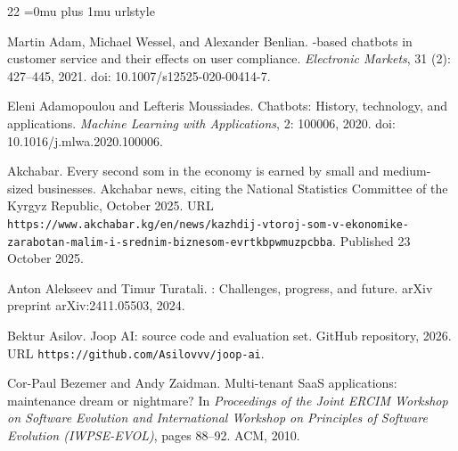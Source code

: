 \begin{thebibliography}{22}
\Urlmuskip=0mu plus 1mu %
\providecommand{\natexlab}[1]{#1}
\providecommand{\url}[1]{\texttt{#1}}
\expandafter\ifx\csname urlstyle\endcsname\relax
  \providecommand{\doi}[1]{doi: #1}\else
  \providecommand{\doi}{doi: \begingroup \urlstyle{rm}\Url}\fi

Martin Adam, Michael Wessel, and Alexander Benlian.
-based chatbots in customer service and their effects on user
  compliance.
\newblock \emph{Electronic Markets}, 31 (2): 427--445, 2021.
\newblock \doi{10.1007/s12525-020-00414-7}.

Eleni Adamopoulou and Lefteris Moussiades.
\newblock Chatbots: History, technology, and applications.
\newblock \emph{Machine Learning with Applications}, 2: 100006, 2020.
\newblock \doi{10.1016/j.mlwa.2020.100006}.

{Akchabar}.
\newblock Every second som in the economy is earned by small and medium-sized
  businesses.
\newblock Akchabar news, citing the National Statistics Committee of the Kyrgyz
  Republic, October 2025.
\newblock URL
  \url{https://www.akchabar.kg/en/news/kazhdij-vtoroj-som-v-ekonomike-zarabotan-malim-i-srednim-biznesom-evrtkbpwmuzpcbba}.
\newblock Published 23 October 2025.

Anton Alekseev and Timur Turatali.
: Challenges, progress, and future.
\newblock arXiv preprint arXiv:2411.05503, 2024.

Bektur Asilov.
\newblock Joop {AI}: source code and evaluation set.
\newblock GitHub repository, 2026.
\newblock URL \url{https://github.com/Asilovvv/joop-ai}.

Cor-Paul Bezemer and Andy Zaidman.
\newblock Multi-tenant {SaaS} applications: maintenance dream or nightmare?
\newblock In \emph{Proceedings of the Joint ERCIM Workshop on Software
  Evolution and International Workshop on Principles of Software Evolution
  (IWPSE-EVOL)}, pages 88--92. ACM, 2010.


\end{thebibliography}
